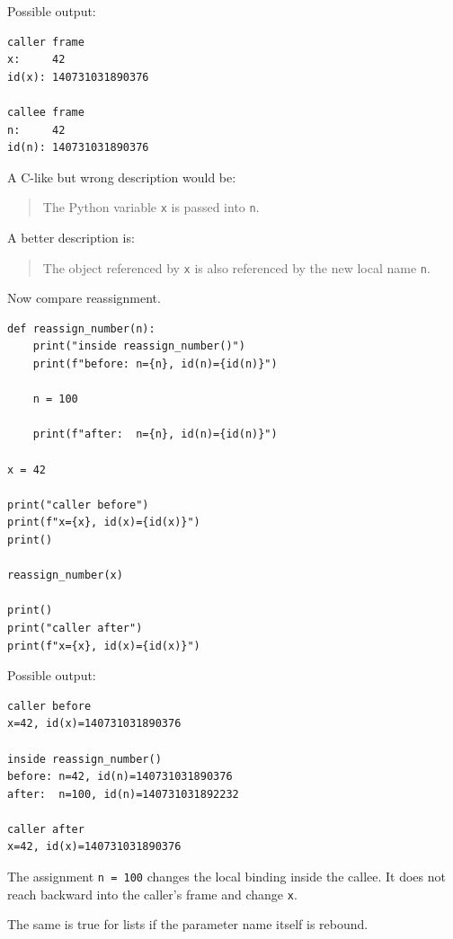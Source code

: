 Possible output:

\begin{verbatim}
caller frame
x:     42
id(x): 140731031890376

callee frame
n:     42
id(n): 140731031890376
\end{verbatim}

A C-like but wrong description would be:

\begin{quote}
The Python variable \texttt{x} is passed into \texttt{n}.
\end{quote}

A better description is:

\begin{quote}
The object referenced by \texttt{x} is also referenced by the new local name \texttt{n}.
\end{quote}

Now compare reassignment.

\begin{verbatim}
def reassign_number(n):
    print("inside reassign_number()")
    print(f"before: n={n}, id(n)={id(n)}")

    n = 100

    print(f"after:  n={n}, id(n)={id(n)}")

x = 42

print("caller before")
print(f"x={x}, id(x)={id(x)}")
print()

reassign_number(x)

print()
print("caller after")
print(f"x={x}, id(x)={id(x)}")
\end{verbatim}

Possible output:

\begin{verbatim}
caller before
x=42, id(x)=140731031890376

inside reassign_number()
before: n=42, id(n)=140731031890376
after:  n=100, id(n)=140731031892232

caller after
x=42, id(x)=140731031890376
\end{verbatim}

The assignment \texttt{n = 100} changes the local binding inside the callee. It does not reach backward into the caller's frame and change \texttt{x}.

The same is true for lists if the parameter name itself is rebound.

